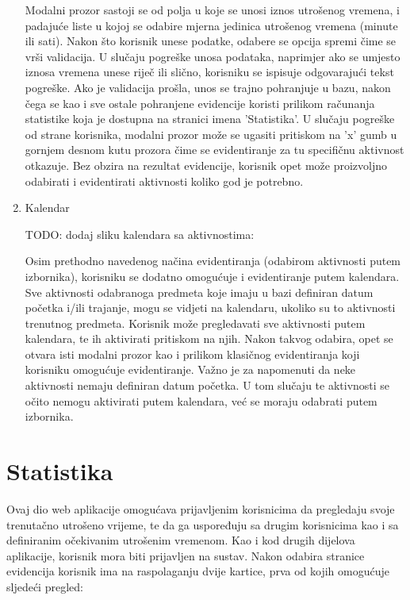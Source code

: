 \documentclass[times, utf8, zavrsni]{fer}
\begin{document}
\begin{enumerate}
Modalni prozor sastoji se od polja u koje se unosi iznos utrošenog vremena, i padajuće liste u kojoj se odabire mjerna jedinica utrošenog vremena (minute ili sati). Nakon što korisnik unese podatke, odabere se opcija spremi čime se vrši validacija. U slučaju pogreške unosa podataka, naprimjer ako se umjesto iznosa vremena unese riječ ili slično, korisniku se ispisuje odgovarajući tekst pogreške. Ako je validacija prošla, unos se trajno pohranjuje u bazu, nakon čega se kao i sve ostale pohranjene evidencije koristi prilikom računanja statistike koja je dostupna na stranici imena 'Statistika'. U slučaju pogreške od strane korisnika, modalni prozor može se ugasiti pritiskom na 'x' gumb u gornjem desnom kutu prozora čime se evidentiranje za tu specifičnu aktivnost otkazuje. Bez obzira na rezultat evidencije, korisnik opet može proizvoljno odabirati i evidentirati aktivnosti koliko god je potrebno.

\item Kalendar

TODO: dodaj sliku kalendara sa aktivnostima:

Osim prethodno navedenog načina evidentiranja (odabirom aktivnosti putem izbornika), korisniku se dodatno omogućuje i evidentiranje putem kalendara. Sve aktivnosti odabranoga predmeta koje imaju u bazi definiran datum početka i/ili trajanje, mogu se vidjeti na kalendaru, ukoliko su to aktivnosti trenutnog predmeta. Korisnik može pregledavati sve aktivnosti putem kalendara, te ih aktivirati pritiskom na njih. Nakon takvog odabira, opet se otvara isti modalni prozor kao i prilikom klasičnog evidentiranja koji korisniku omogućuje evidentiranje. Važno je za napomenuti da neke aktivnosti nemaju definiran datum početka. U tom slučaju te aktivnosti se očito nemogu aktivirati putem kalendara, već se moraju odabrati putem izbornika.
\end{enumerate}
\clearpage

\section{Statistika}
Ovaj dio web aplikacije omogućava prijavljenim korisnicima da pregledaju svoje trenutačno utrošeno vrijeme, te da ga uspoređuju sa drugim korisnicima kao i sa definiranim očekivanim utrošenim vremenom. Kao i kod drugih dijelova aplikacije, korisnik mora biti prijavljen na sustav. Nakon odabira stranice evidencija korisnik ima na raspolaganju dvije kartice, prva od kojih omogućuje sljedeći pregled:
\end{document}
